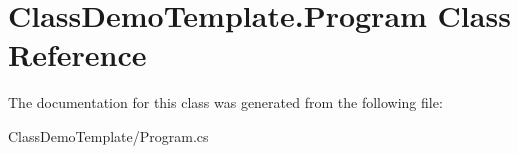 \hypertarget{class_class_demo_template_1_1_program}{}\section{Class\+Demo\+Template.\+Program Class Reference}
\label{class_class_demo_template_1_1_program}


The documentation for this class was generated from the following file\+:\begin{DoxyCompactItemize}
\item 
Class\+Demo\+Template/Program.\+cs\end{DoxyCompactItemize}
